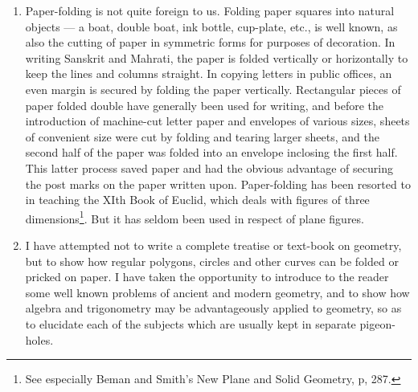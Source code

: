 \begin{enumerate}
\begin{enumerate}[(1)]
                \begin{figure}
                    \label{fig:isosceles_fold}
                    \begin{center}
                        \caption{xx}
                    \end{center}
                \end{figure}


                Fig.~\ref{fig:isosceles_fold} shows by paper-folding that,
                whatever triangle be taken, $CO$ and $ZO$ cannot meet within the
                triangle.

                $O$ is the mid-point of the arc $AOB$ of the circle which
                circumscribes the triangle $ABC$.

        \end{enumerate}

    \item Paper-folding is not quite foreign to us. Folding paper squares into
        natural objects --- a boat, double boat, ink bottle, cup-plate, etc., is
        well known, as also the cutting of paper in symmetric forms for purposes
        of decoration. In writing Sanskrit and Mahrati, the paper is folded
        vertically or horizontally to keep the lines and columns straight.  In
        copying letters in public offices, an even margin is secured by folding
        the paper vertically.  Rectangular pieces of paper folded double have
        generally been used for writing, and before the introduction of
        machine-cut letter paper and envelopes of various sizes, sheets of
        convenient size were cut by folding and tearing larger sheets, and the
        second half of the paper was folded into an envelope inclosing the first
        half.  This latter process saved paper and had the obvious advantage of
        securing the post marks on the paper written upon.  Paper-folding has
        been resorted to in teaching the XIth Book of Euclid, which deals with
        figures of three dimensions\footnote{See especially Beman and Smith’s
        New Plane and Solid Geometry, p, 287.}.  But it has seldom been used in
        respect of plane figures.


    \item I have attempted not to write a complete treatise or text-book on
        geometry, but to show how regular polygons, circles and other curves can
        be folded or pricked on paper. I have taken the opportunity to introduce
        to the reader some well known problems of ancient and modern geometry,
        and to show how algebra and trigonometry may be advantageously applied
        to geometry, so as to elucidate each of the subjects which are usually
        kept in separate pigeon-holes.



\end{enumerate}
